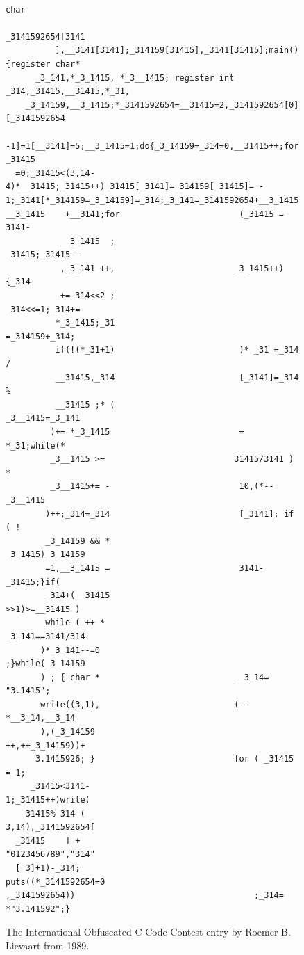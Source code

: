 \begin{figure}
\centering
\vspace{-2em}
\begin{minipage}[t]{.5\textwidth}%
\begin{tiny}
\begin{verbatim}
                                                                        char
                                                            _3141592654[3141
          ],__3141[3141];_314159[31415],_3141[31415];main(){register char*
      _3_141,*_3_1415, *_3__1415; register int _314,_31415,__31415,*_31,
    _3_14159,__3_1415;*_3141592654=__31415=2,_3141592654[0][_3141592654
   -1]=1[__3141]=5;__3_1415=1;do{_3_14159=_314=0,__31415++;for( _31415
  =0;_31415<(3,14-4)*__31415;_31415++)_31415[_3141]=_314159[_31415]= -
1;_3141[*_314159=_3_14159]=_314;_3_141=_3141592654+__3_1415;_3_1415=
__3_1415    +__3141;for                        (_31415 = 3141-
           __3_1415  ;                        _31415;_31415--
           ,_3_141 ++,                        _3_1415++){_314
           +=_314<<2 ;                        _314<<=1;_314+=
          *_3_1415;_31                         =_314159+_314;
          if(!(*_31+1)                         )* _31 =_314 /
          __31415,_314                         [_3141]=_314 %
          __31415 ;* (                         _3__1415=_3_141
         )+= *_3_1415                          = *_31;while(*
         _3__1415 >=                          31415/3141 ) *
         _3__1415+= -                          10,(*--_3__1415
        )++;_314=_314                          [_3141]; if ( !
        _3_14159 && *                          _3_1415)_3_14159
        =1,__3_1415 =                          3141-_31415;}if(
        _314+(__31415                           >>1)>=__31415 )
        while ( ++ *                           _3_141==3141/314
       )*_3_141--=0                           ;}while(_3_14159
       ) ; { char *                           __3_14= "3.1415";
       write((3,1),                           (--*__3_14,__3_14
       ),(_3_14159                            ++,++_3_14159))+
      3.1415926; }                            for ( _31415 = 1;
     _31415<3141-                            1;_31415++)write(
    31415% 314-(                            3,14),_3141592654[
  _31415    ] +                                   "0123456789","314"
  [ 3]+1)-_314;                                   puts((*_3141592654=0
,_3141592654))                                    ;_314= *"3.141592";}
\end{verbatim}
\end{tiny}
\end{minipage}
\caption{The International Obfuscated C Code Contest entry by Roemer B. Lievaart from 1989.}
\label{fig:pi}
\end{figure}

